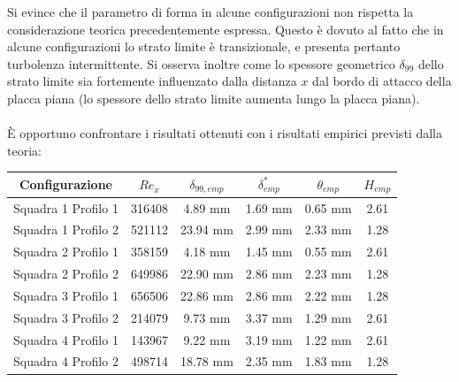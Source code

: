 \noindent Si evince che il parametro di forma in alcune configurazioni non rispetta la considerazione teorica precedentemente espressa. Questo è dovuto al fatto che in alcune configurazioni lo strato limite è transizionale, e presenta pertanto turbolenza intermittente. Si osserva inoltre come lo spessore geometrico $\delta_{99}$ dello strato limite sia fortemente influenzato dalla distanza $x$ dal bordo di attacco della placca piana (lo spessore dello strato limite aumenta lungo la placca piana).\\\\
\noindent È opportuno confrontare i risultati ottenuti con i risultati empirici previsti dalla teoria:
\begin{table}[H]
    \centering
    \begin{tabular}{|c|c|c|c|c|c|}
    \hline
    Configurazione             & $Re_x$ & $\delta_{99,emp}$ & $\delta^*_{emp}$ & $\theta_{emp}$ & $H_{emp}$ \\ \hline
    Squadra 1 Profilo 1 & 316408 & 4.89 mm           & 1.69 mm          & 0.65 mm        & 2.61      \\ \hline
    Squadra 1 Profilo 2 & 521112 & 23.94 mm          & 2.99 mm          & 2.33 mm        & 1.28      \\ \hline
    Squadra 2 Profilo 1 & 358159 & 4.18 mm           & 1.45 mm          & 0.55 mm        & 2.61      \\ \hline
    Squadra 2 Profilo 2 & 649986 & 22.90 mm          & 2.86 mm          & 2.23 mm        & 1.28      \\ \hline
    Squadra 3 Profilo 1 & 656506 & 22.86 mm          & 2.86 mm          & 2.22 mm        & 1.28      \\ \hline
    Squadra 3 Profilo 2 & 214079 & 9.73 mm           & 3.37 mm          & 1.29 mm        & 2.61      \\ \hline
    Squadra 4 Profilo 1 & 143967 & 9.22 mm           & 3.19 mm          & 1.22 mm        & 2.61      \\ \hline
    Squadra 4 Profilo 2 & 498714 & 18.78 mm          & 2.35 mm          & 1.83 mm        & 1.28      \\ \hline
    \end{tabular}
\end{table}

